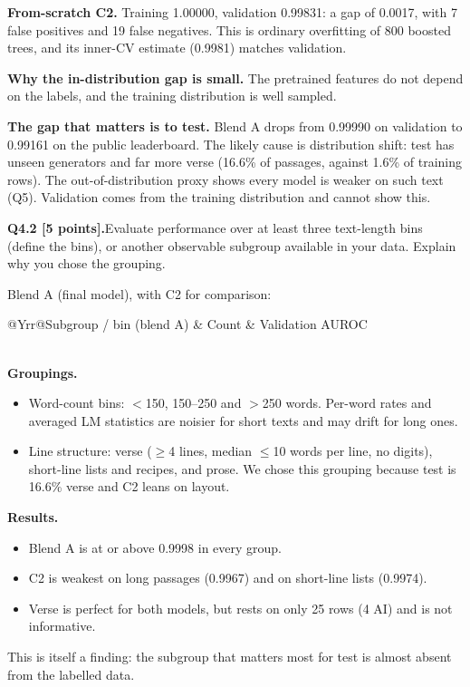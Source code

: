 \documentclass[11pt,letterpaper]{article}
\newcommand{\question}[2]{\needspace{4\baselineskip}\par\addvspace{0.45em}\noindent\textbf{#1}\quad #2\par\nobreak\vspace{0.1em}}
\begin{document}
\textbf{From-scratch C2.} Training 1.00000, validation 0.99831: a gap of 0.0017, with 7 false positives and 19 false negatives. This is ordinary overfitting of 800 boosted trees, and its inner-CV estimate (0.9981) matches validation.

\textbf{Why the in-distribution gap is small.} The pretrained features do not depend on the labels, and the training distribution is well sampled.

\textbf{The gap that matters is to test.} Blend A drops from 0.99990 on validation to 0.99161 on the public leaderboard. The likely cause is distribution shift: test has unseen generators and far more verse (16.6\% of passages, against 1.6\% of training rows). The out-of-distribution proxy shows every model is weaker on such text (Q5). Validation comes from the training distribution and cannot show this.

\question{Q4.2 [5 points].}{Evaluate performance over at least three text-length bins (define the bins), or another observable subgroup available in your data. Explain why you chose the grouping.}
Blend A (final model), with C2 for comparison:

\begin{tabularx}{\linewidth}{@{}Yrr@{}}\toprule Subgroup / bin (blend A) & Count & Validation AUROC \\ \midrule
{}
\midrule
{} \\
\bottomrule\end{tabularx}

\textbf{Groupings.}
\begin{itemize}
\item Word-count bins: $<$150, 150--250 and $>$250 words. Per-word rates and averaged LM statistics are noisier for short texts and may drift for long ones.
\item Line structure: verse ($\ge$4 lines, median $\le$10 words per line, no digits), short-line lists and recipes, and prose. We chose this grouping because test is 16.6\% verse and C2 leans on layout.
\end{itemize}

\textbf{Results.}
\begin{itemize}
\item Blend A is at or above 0.9998 in every group.
\item C2 is weakest on long passages (0.9967) and on short-line lists (0.9974).
\item Verse is perfect for both models, but rests on only 25 rows (4 AI) and is not informative.
\end{itemize}
This is itself a finding: the subgroup that matters most for test is almost absent from the labelled data.
\end{document}
